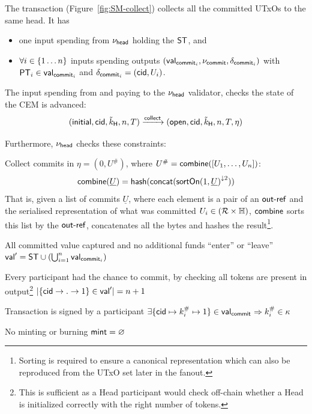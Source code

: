 \noindent The \mtxCCom{} transaction (Figure~\ref{fig:SM-collect}) collects all the committed UTxOs to the same head. It has
\begin{itemize}
  \item one input spending from $\nu_\mathsf{head}$ holding the $\mathsf{ST}$, and
  \item $\forall i \in \{1 \dots n\}$ inputs spending \mtxCom{} outputs $(\mathsf{val}_{\mathsf{commit}_{i}}, \nu_{\mathsf{commit}}, \delta_{\mathsf{commit}_{i}})$ with $\mathsf{PT}_{i} \in \mathsf{val}_{\mathsf{commit}_{i}}$ and $\delta_{\mathsf{commit}_{i}} = (\mathsf{cid}, U_{i})$.
\end{itemize}

\noindent The input spending from and paying to the $\nu_\mathsf{head}$ validator, checks the state
of the CEM is advanced:
\[
   (\mathsf{initial},\mathsf{cid},\tilde{k}_{\mathsf{H}},n,T) \xrightarrow{\mathsf{collect}} (\mathsf{open},\mathsf{cid},\tilde{k}_{\mathsf{H}},n,T,\eta)
\]

\begin{samepage}
\noindent Furthermore, $\nu_\mathsf{head}$ checks these constraints:
\begin{menumerate}
  \item Collect commits in $\eta = (0, U^{\#})$, where
  $U^{\#} = \mathsf{combine}([U_{1}, \dots, U_{n}])$:
  \[
    \mathsf{combine}(\underline{U}) = \mathsf{hash}(\mathsf{concat}({\mathsf{sortOn}(1, \underline{U})}^{\downarrow2}))
  \]
  That is, given a list of commits $\underline{U}$, where each element is a pair
  of an $\mathsf{out\textsf{-}{}ref}$ and the serialised representation of what was committed
  $U_{i} \in (\mathcal{R} \times \mathbb{H})$, $\mathsf{combine}$ sorts this list by the
  $\mathsf{out\textsf{-}{}ref}$, concatenates all the bytes and hashes the
  result\footnote{Sorting is required to ensure a canonical representation
    which can also be reproduced from the UTxO set later in the fanout.}.

  \item All committed value captured and no additional funds ``enter'' or ``leave''\\
  $\mathsf{val}' = \mathsf{ST} \cup (\bigcup_{i=1}^{n} \mathsf{val}_{\mathsf{commit}_{i}})$
  \item Every participant had the chance to commit, by checking all tokens are present in output\footnote{This is sufficient as a Head participant would check off-chain whether a Head is initialized correctly with the right number of tokens.}
  $|\{\mathsf{cid} \rightarrow . \rightarrow 1\} \in \mathsf{val}'| = n + 1$
  \item Transaction is signed by a participant $\exists \{\mathsf{cid} \mapsto k^{\#}_{i} \mapsto 1\} \in \mathsf{val}_{\mathsf{commit}_{}} \Rightarrow k^{\#}_{i} \in \kappa$
  \item No minting or burning  $\mathsf{mint} = \varnothing$
\end{menumerate}
\end{samepage}

